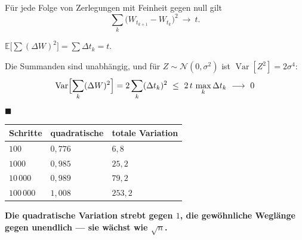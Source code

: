 \begin{merksatz}
Für jede Folge von Zerlegungen mit Feinheit gegen null gilt
\[ \sum_{k} \bigl(W_{t_{k+1}}-W_{t_k}\bigr)^{2} \ \longrightarrow\ t . \]

 $\mathbb{E}\bigl[\sum (\Delta W)^{2}\bigr] = \sum \Delta t_k = t$.

 Die Summanden sind unabhängig, und für $Z \sim \mathcal N(0,\sigma^2)$ ist $\operatorname{Var}[Z^{2}] = 2\sigma^{4}$:
\[ \operatorname{Var}\Bigl[\sum_k (\Delta W)^{2}\Bigr] = 2\sum_k (\Delta t_k)^{2} \ \le\ 2\,t\,\max_k \Delta t_k \ \longrightarrow\ 0 \]
$\blacksquare$

\begin{center}
{\small
\renewcommand{\arraystretch}{1.48}
\begin{tabular}{@{}P{1.8cm}P{2.6cm}P{2.6cm}@{}}
\toprule
\textbf{Schritte} & \textbf{quadratische} & \textbf{totale Variation}\\
\midrule
$100$ & $0{,}776$ & $6{,}8$\\
$1000$ & $0{,}985$ & $25{,}2$\\
$10\,000$ & $0{,}989$ & $79{,}2$\\
$100\,000$ & $1{,}008$ & $253{,}2$\\
\bottomrule
\end{tabular}}
\end{center}

\begin{center}
\begin{minipage}{0.9\textwidth}
\textbf{Die quadratische Variation strebt gegen $1$, die gewöhnliche Weglänge gegen unendlich --- sie wächst wie $\sqrt n$.}
\end{minipage}
\end{center}

\begin{center}
\begin{minipage}{0.88\textwidth}
\end{minipage}
\end{center}
\end{merksatz}

